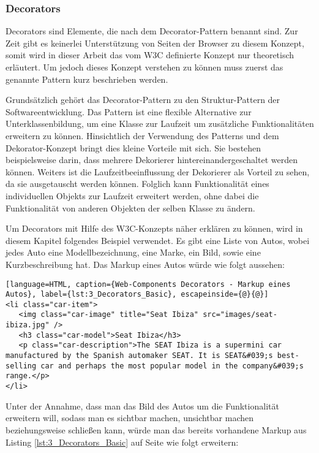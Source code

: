 \subsubsection{Decorators}
\label{sec:3_WC_Decorators}

Decorators sind Elemente, die nach dem Decorator-Pattern benannt sind. Zur Zeit gibt es keinerlei Unterstützung von Seiten der Browser zu diesem Konzept, somit wird in dieser Arbeit das vom W3C definierte Konzept nur theoretisch erläutert. Um jedoch dieses Konzept verstehen zu können muss zuerst das genannte Pattern kurz beschrieben werden.

Grundsätzlich gehört das Decorator-Pattern zu den Struktur-Pattern der Softwareentwicklung. Das Pattern ist eine flexible Alternative zur Unterklassenbildung, um eine Klasse zur Laufzeit um zusätzliche Funktionalitäten erweitern zu können. Hinsichtlich der Verwendung des Patterns und dem Dekorator-Konzept bringt dies kleine Vorteile mit sich. Sie bestehen beispielsweise darin, dass mehrere Dekorierer hintereinandergeschaltet werden können. Weiters ist die Laufzeitbeeinflussung der Dekorierer als Vorteil zu sehen, da sie ausgetauscht werden können. Folglich kann Funktionalität eines individuellen Objekts zur Laufzeit erweitert werden, ohne dabei die Funktionalität von anderen Objekten der selben Klasse zu ändern.

Um Decorators mit Hilfe des W3C-Konzepts näher erklären zu können, wird in diesem Kapitel folgendes Beispiel verwendet. Es gibt eine Liste von Autos, wobei jedes Auto
eine Modellbezeichnung, eine Marke, ein Bild, sowie eine Kurzbeschreibung hat. Das Markup eines Autos würde wie folgt aussehen:

\begin{lstlisting}[language=HTML, caption={Web-Components Decorators - Markup eines Autos}, label={lst:3_Decorators_Basic}, escapeinside={@}{@}]
<li class="car-item">
   <img class="car-image" title="Seat Ibiza" src="images/seat-ibiza.jpg" />
   <h3 class="car-model">Seat Ibiza</h3>
   <p class="car-description">The SEAT Ibiza is a supermini car manufactured by the Spanish automaker SEAT. It is SEAT&#039;s best-selling car and perhaps the most popular model in the company&#039;s range.</p>
</li>
\end{lstlisting}

Unter der Annahme, dass man das Bild des Autos um die Funktionalität erweitern will, sodass man es sichtbar machen, unsichtbar machen beziehungsweise schließen kann, würde man das bereits vorhandene Markup aus Listing \ref{lst:3_Decorators_Basic} auf Seite \pageref{lst:3_Decorators_Basic} wie folgt erweitern:


